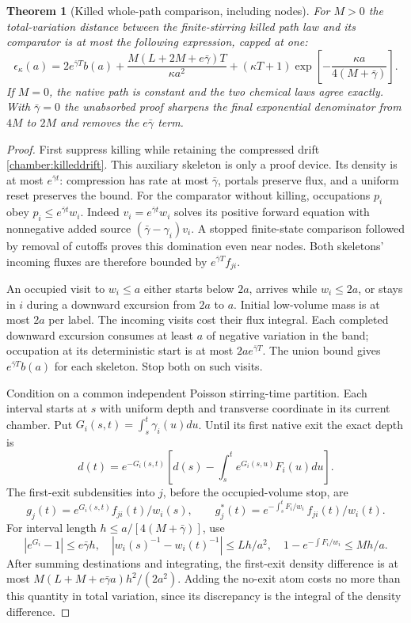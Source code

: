 \documentclass[11pt,oneside,openany]{book}
\newtheorem{theorem}{Theorem}[chapter]
\theoremstyle{definition}
\theoremstyle{remark}\newtheorem{remark}[theorem]{Remark}
\begin{document}
\begin{theorem}[Killed whole-path comparison, including nodes]
\label{chamber:path}
For $M>0$ the total-variation distance between the finite-stirring killed path law and its comparator is at most the following expression, capped at one:
\begin{equation}
 \epsilon_\kappa(a)=2e^{\bar\gamma T}b(a)
 +\frac{M(L+2M+e\bar\gamma)T}{\kappa a^2}
 +(\kappa T+1)\exp\left[-\frac{\kappa a}{4(M+\bar\gamma)}\right].
 \label{chamber:pathbound}
\end{equation}
If $M=0$, the native path is constant and the two chemical laws agree exactly. With $\bar\gamma=0$ the unabsorbed proof sharpens the final exponential denominator from $4M$ to $2M$ and removes the $e\bar\gamma$ term.
\end{theorem}
\begin{proof}
First suppress killing while retaining the compressed drift \eqref{chamber:killeddrift}. This auxiliary skeleton is only a proof device. Its density is at most $e^{\bar\gamma t}$: compression has rate at most $\bar\gamma$, portals preserve flux, and a uniform reset preserves the bound. For the comparator without killing, occupations $p_i$ obey $p_i\le e^{\bar\gamma t}w_i$. Indeed $v_i=e^{\bar\gamma t}w_i$ solves its positive forward equation with nonnegative added source $(\bar\gamma-\gamma_i)v_i$. A stopped finite-state comparison followed by removal of cutoffs proves this domination even near nodes. Both skeletons' incoming fluxes are therefore bounded by $e^{\bar\gamma T}f_{ji}$.

An occupied visit to $w_i\le a$ either starts below $2a$, arrives while $w_i\le2a$, or stays in $i$ during a downward excursion from $2a$ to $a$. Initial low-volume mass is at most $2a$ per label. The incoming visits cost their flux integral. Each completed downward excursion consumes at least $a$ of negative variation in the band; occupation at its deterministic start is at most $2ae^{\bar\gamma T}$. The union bound gives $e^{\bar\gamma T}b(a)$ for each skeleton. Stop both on such visits.

Condition on a common independent Poisson stirring-time partition. Each interval starts at $s$ with uniform depth and transverse coordinate in its current chamber. Put $G_i(s,t)=\int_s^t\gamma_i(u)du$. Until its first native exit the exact depth is
\[
 d(t)=e^{-G_i(s,t)}\left[d(s)-\int_s^te^{G_i(s,u)}F_i(u)du\right].
\]
The first-exit subdensities into $j$, before the occupied-volume stop, are
\[
 g_j(t)=e^{G_i(s,t)}f_{ji}(t)/w_i(s),
 \qquad
 g_j^*(t)=e^{-\int_s^tF_i/w_i}\,f_{ji}(t)/w_i(t).
\]
For interval length $h\le a/[4(M+\bar\gamma)]$, use
\[
 |e^{G_i}-1|\le e\bar\gamma h,\quad 
 |w_i(s)^{-1}-w_i(t)^{-1}|\le Lh/a^2,\quad 
 1-e^{-\int F_i/w_i}\le Mh/a.
\]
After summing destinations and integrating, the first-exit density difference is at most $M(L+M+e\bar\gamma a)h^2/(2a^2)$. Adding the no-exit atom costs no more than this quantity in total variation, since its discrepancy is the integral of the density difference.


\end{proof}
\end{document}
